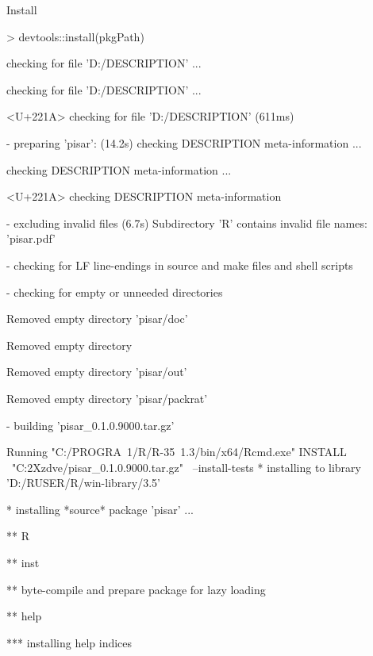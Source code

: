 \documentclass[a4paper,12pt]{article}\usepackage[]{graphicx}\usepackage[]{color}
\begin{document}
Install

\begin{Schunk}
\begin{Sinput}
> devtools::install(pkgPath)
\end{Sinput}
\begin{Soutput}

  
  
  
   checking for file 'D:\OMIKE\pisar/DESCRIPTION' ...
  
   checking for file 'D:\OMIKE\pisar/DESCRIPTION' ... 
  
<U+221A>  checking for file 'D:\OMIKE\pisar/DESCRIPTION' (611ms)

  
  
  
-  preparing 'pisar': (14.2s)
   checking DESCRIPTION meta-information ...
  
   checking DESCRIPTION meta-information ... 
  
<U+221A>  checking DESCRIPTION meta-information

  
  
  
-  excluding invalid files (6.7s)
   Subdirectory 'R' contains invalid file names:
     'pisar.pdf'

  
  
  
-  checking for LF line-endings in source and make files and shell scripts

  
  
  
-  checking for empty or unneeded directories

  
   Removed empty directory 'pisar/doc'

  
Removed empty directory 
  
   Removed empty directory 'pisar/out'

  
   Removed empty directory 'pisar/packrat'

  
  
  
-  building 'pisar_0.1.0.9000.tar.gz'

  
   

Running "C:/PROGRA~1/R/R-35~1.3/bin/x64/Rcmd.exe" INSTALL \
  "C:\Users\ablejec\AppData\Local\Temp\Rtmp2Xzdve/pisar_0.1.0.9000.tar.gz" \
  --install-tests 
* installing to library 'D:/RUSER/R/win-library/3.5'

* installing *source* package 'pisar' ...

** R

** inst

** byte-compile and prepare package for lazy loading

** help

*** installing help indices


\end{Soutput}
\end{Schunk}
\end{document}
